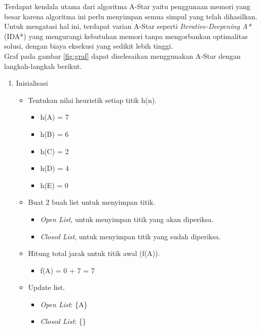 Terdapat kendala utama dari algoritma A-Star yaitu penggunaan memori yang besar karena algoritma ini perlu menyimpan semua simpul yang telah dihasilkan. Untuk mengatasi hal ini, terdapat varian A-Star seperti \textit{Iterative-Deepening A*} (IDA*) yang mengurangi kebutuhan memori tanpa mengorbankan optimalitas solusi, dengan biaya eksekusi yang sedikit lebih tinggi.
\\
Graf pada gambar \ref{fig:graf} dapat diselesaikan menggunakan A-Star dengan langkah-langkah berikut.
\begin{enumerate}
    \item Inisialisasi
    \begin{itemize}
        \item Tentukan nilai heuristik setiap titik h(n).
        \begin{itemize}
            \item h(A) = 7
            \item h(B) = 6
            \item h(C) = 2
            \item h(D) = 4
            \item h(E) = 0 
        \end{itemize}
        \item Buat 2 buah list untuk menyimpan titik.
        \begin{itemize}
            \item \textit{Open List}, untuk menyimpan titik yang akan diperiksa.
            \item \textit{Closed List}, untuk menyimpan titik yang sudah diperiksa.
        \end{itemize}
        \item Hitung total jarak untuk titik awal (f(A)).
        \begin{itemize}
            \item f(A) = 0 + 7 = 7
        \end{itemize}
        \item Update list.
        \begin{itemize}
            \item \textit{Open List}: \{A\}
            \item \textit{Closed List}: \{\}
        \end{itemize}
    \end{itemize}


\end{enumerate}
